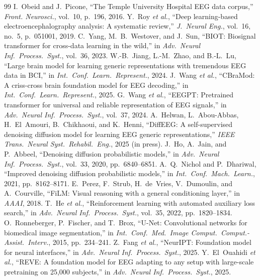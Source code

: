 \documentclass[journal]{IEEEtran}
\begin{document}
\begin{thebibliography}{99}
 I.~Obeid and J.~Picone, ``The Temple University Hospital EEG data corpus,'' \emph{Front. Neurosci.}, vol.~10, p.~196, 2016.
 Y.~Roy \emph{et al.}, ``Deep learning-based electroencephalography analysis: A systematic review,'' \emph{J.\ Neural Eng.}, vol.~16, no.~5, p.~051001, 2019.
 C.~Yang, M.~B.~Westover, and J.~Sun, ``BIOT: Biosignal transformer for cross-data learning in the wild,'' in \emph{Adv.\ Neural Inf.\ Process.\ Syst.}, vol.~36, 2023.
 W.-B.~Jiang, L.-M.~Zhao, and B.-L.~Lu, ``Large brain model for learning generic representations with tremendous EEG data in BCI,'' in \emph{Int.\ Conf.\ Learn.\ Represent.}, 2024.
 J.~Wang \emph{et al.}, ``CBraMod: A criss-cross brain foundation model for EEG decoding,'' in \emph{Int.\ Conf.\ Learn.\ Represent.}, 2025.
 G.~Wang \emph{et al.}, ``EEGPT: Pretrained transformer for universal and reliable representation of EEG signals,'' in \emph{Adv.\ Neural Inf.\ Process.\ Syst.}, vol.~37, 2024.
 A.~Helwan, L.~Abou-Abbas, H.~El~Amouri, B.~Chikhaoui, and K.~Henni, ``DiffEEG: A self-supervised denoising diffusion model for learning EEG generic representations,'' \emph{IEEE Trans.\ Neural Syst.\ Rehabil.\ Eng.}, 2025 (in press).
 J.~Ho, A.~Jain, and P.~Abbeel, ``Denoising diffusion probabilistic models,'' in \emph{Adv.\ Neural Inf.\ Process.\ Syst.}, vol.~33, 2020, pp.~6840--6851.
 A.~Q.~Nichol and P.~Dhariwal, ``Improved denoising diffusion probabilistic models,'' in \emph{Int.\ Conf.\ Mach.\ Learn.}, 2021, pp.~8162--8171.
 E.~Perez, F.~Strub, H.~de~Vries, V.~Dumoulin, and A.~Courville, ``FiLM: Visual reasoning with a general conditioning layer,'' in \emph{AAAI}, 2018.
 T.~He \emph{et al.}, ``Reinforcement learning with automated auxiliary loss search,'' in \emph{Adv.\ Neural Inf.\ Process.\ Syst.}, vol.~35, 2022, pp.~1820--1834.
 O.~Ronneberger, P.~Fischer, and T.~Brox, ``U-Net: Convolutional networks for biomedical image segmentation,'' in \emph{Int.\ Conf.\ Med.\ Image Comput.\ Comput.-Assist.\ Interv.}, 2015, pp.~234--241.
 Z.~Fang \emph{et al.}, ``NeurIPT: Foundation model for neural interfaces,'' in \emph{Adv.\ Neural Inf.\ Process.\ Syst.}, 2025.
 Y.~El~Ouahidi \emph{et al.}, ``REVE: A foundation model for EEG adapting to any setup with large-scale pretraining on 25,000 subjects,'' in \emph{Adv.\ Neural Inf.\ Process.\ Syst.}, 2025.

\end{thebibliography}
\end{document}
